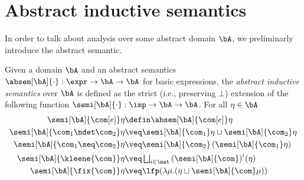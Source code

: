 \section{Abstract inductive semantics}\label{sec:abstractsem}

In order to talk about analysis over some abstract domain \(\bA\), we
preliminarly introduce the abstract semantic.

\begin{definition}\label{def:abstrsem}
  Given a domain \(\bA\) and an abstract semantics
  \(\absem[\bA]{\cdot} : \expr \to \bA \to
  \bA\) for basic expressions, the \emph{abstract inductive
    semantics} over \(\bA\) is defined as the strict (i.e.,
  preserving \(\bot\)) extension of the following function
  \({\semi[\bA]{\cdot} : \imp \to \bA \to
    \bA}\). For all \(\eta \in \bA\)
  \begin{align*}
    \semi[\bA]{\com[e]}\eta & \defin \absem[ \bA]{\com[e]}\eta\\
    \semi[\bA]{\com_1 \ndet \com_2} \eta
    & \veq \semi[\bA]{\com_1} \eta \sqcup \semi[\bA]{\com_2} \eta\\
    \semi[\bA]{\com_1 \seq \com_2} \eta
    & \veq \semi[\bA]{\com_2} \left(\semi[\bA]{\com_1} \eta\right)\\
    \semi[\bA]{\kleene{\com}} \eta
    & \veq \textstyle \bigsqcup_{i \in \nat} {\left(\semi[\bA]{\com}\right)}^i (\eta)\\
    \semi[\bA]{\fix{\com}} \eta
    & \veq  \lfp(\lambda \mu. (\eta \sqcup \semi[\bA]{\com} \mu))
  \end{align*}
\end{definition}

